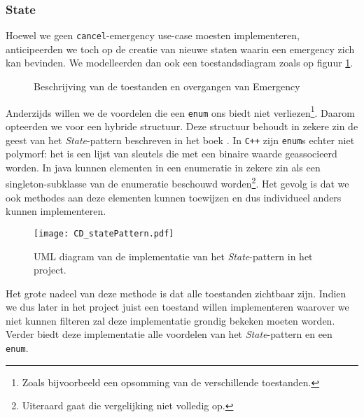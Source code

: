 \subsubsection{State}
Hoewel we geen \verb+cancel+-emergency use-case moesten implementeren, anticipeerden we toch op de creatie van nieuwe staten waarin een emergency zich kan bevinden. We modelleerden dan ook een toestandsdiagram zoals op figuur \ref{fig:stateDiagramEmergency}.
\begin{figure}[htb]
\centering
{}
\caption{Beschrijving van de toestanden en overgangen van Emergency}
\label{fig:stateDiagramEmergency}
\end{figure}
Anderzijds willen we de voordelen die een \verb+enum+ ons biedt niet verliezen\footnote{Zoals bijvoorbeeld een opsomming van de verschillende toestanden.}. Daarom opteerden we voor een hybride structuur. Deze structuur behoudt in zekere zin de geest van het \textit{State}-pattern beschreven in het boek \cite{book:designpatterns}. In \verb#C++# zijn \verb+enum+s echter niet polymorf: het is een lijst van sleutels die met een binaire waarde geassocieerd worden. In java kunnen elementen in een enumeratie in zekere zin als een singleton-subklasse van de enumeratie beschouwd worden\footnote{Uiteraard gaat die vergelijking niet volledig op.}. Het gevolg is dat we ook methodes aan deze elementen kunnen toewijzen en dus individueel anders kunnen implementeren.
\begin{figure}[htb]
\texttt{[image: CD\_statePattern.pdf]}
\caption{UML diagram van de implementatie van het \textit{State}-pattern in het project.}
\label{fig:statePattern}
\end{figure}
Het grote nadeel van deze methode is dat alle toestanden zichtbaar zijn. Indien we dus later in het project juist een toestand willen implementeren waarover we niet kunnen filteren zal deze implementatie grondig bekeken moeten worden. Verder biedt deze implementatie alle voordelen van het \textit{State}-pattern en een \verb+enum+.
